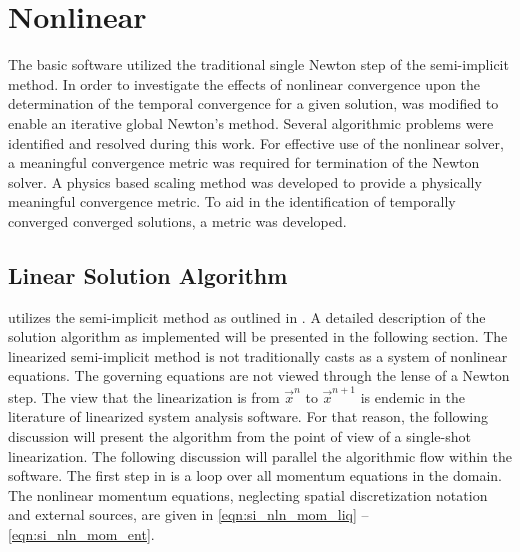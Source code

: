 \chapter{Nonlinear \cobra{}}
\label{chap:nln_solver}
The basic \cobra{} software utilized the traditional single Newton step of the semi-implicit method.
In order to investigate the effects of nonlinear convergence upon the determination of the temporal convergence for a given solution, \cobra{} was modified to enable an iterative global Newton's method.
Several algorithmic problems were identified and resolved during this work.
For effective use of the nonlinear solver, a meaningful convergence metric was required for termination of the Newton solver.
A physics based scaling method was developed to provide a physically meaningful convergence metric.
To aid in the identification of temporally converged converged solutions, a metric was developed.

\section{Linear Solution Algorithm}
\label{sect:lin_cobra_alg}

\cobra{} utilizes the semi-implicit method as outlined in .
A detailed description of the solution algorithm as implemented will be presented in the following section.
The linearized semi-implicit method is not traditionally casts as a system of nonlinear equations.
The governing equations are not viewed through the lense of a Newton step.
The view that the linearization is from $\vec{x}^{n}$ to $\vec{x}^{n+1}$ is endemic in the literature of linearized system analysis software.
For that reason, the following discussion will present the algorithm from the point of view of a single-shot linearization.
The following discussion will parallel the algorithmic flow within the \cobra{} software.
The first step in \cobra{} is a loop over all momentum equations in the domain.
The nonlinear momentum equations, neglecting spatial discretization notation and external sources, are given in \eqref{eqn:si_nln_mom_liq} -- \eqref{eqn:si_nln_mom_ent}.

